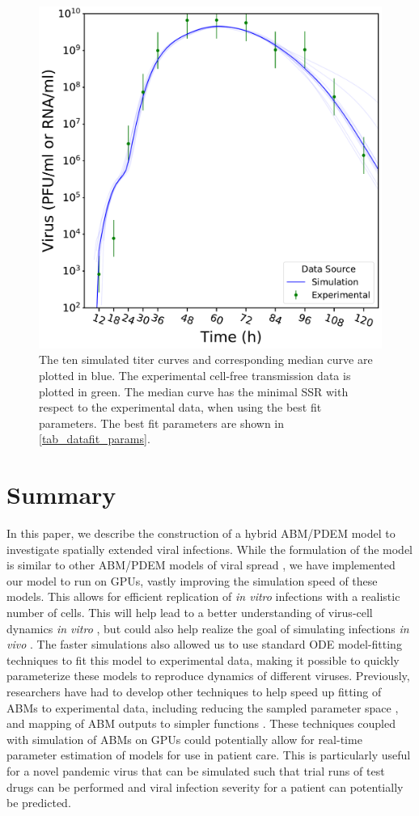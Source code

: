 \begin{figure}
\centering
    \includegraphics[width=0.6\linewidth]{Figures/DataFit.pdf}
\caption{The ten simulated titer curves and corresponding median curve are plotted in blue. The experimental cell-free transmission data \citep{pinilla12} is plotted in green. The median curve has the minimal SSR with respect to the experimental data, when using the best fit parameters. The best fit parameters are shown in \ref{tab_datafit_params}. \label{fig_DataFit}}
\end{figure}

\section{Summary}

In this paper, we describe the construction of a hybrid ABM/PDEM model to investigate spatially extended viral infections. While the formulation of the model is similar to other ABM/PDEM models of viral spread \citep{beauchemin_simple_2005, bauer_agent-based_2009}, we have implemented our model to run on GPUs, vastly improving the simulation speed of these models. This allows for efficient replication of \emph{in vitro} infections with a realistic number of cells. This will help lead to a better understanding of virus-cell dynamics \emph{in vitro} \citep{blahut21}, but could also help realize the goal of simulating infections \emph{in vivo} \citep{laubenbacher21}. The faster simulations also allowed us to use standard ODE model-fitting techniques to fit this model to experimental data, making it possible to quickly parameterize these models to reproduce dynamics of different viruses. Previously, researchers have had to develop other techniques to help speed up fitting of ABMs to experimental data, including reducing the sampled parameter space \citep{li17}, and mapping of ABM outputs to simpler functions \citep{tong_development_2015, read16}. These techniques coupled with simulation of ABMs on GPUs could potentially allow for real-time parameter estimation of models for use in patient care. This is particularly useful for a novel pandemic virus that can be simulated such that trial runs of test drugs can be performed and viral infection severity for a patient can potentially be predicted.

